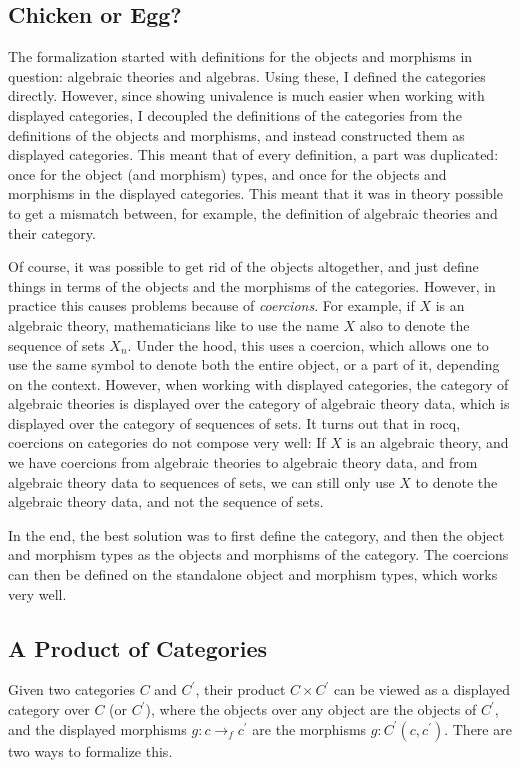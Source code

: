 \subsection{Chicken or Egg?}
The formalization started with definitions for the objects and morphisms in question: algebraic theories and algebras. Using these, I defined the categories directly. However, since showing univalence is much easier when working with displayed categories, I decoupled the definitions of the categories from the definitions of the objects and morphisms, and instead constructed them as displayed categories. This meant that of every definition, a part was duplicated: once for the object (and morphism) types, and once for the objects and morphisms in the displayed categories. This meant that it was in theory possible to get a mismatch between, for example, the definition of algebraic theories and their category.

Of course, it was possible to get rid of the objects altogether, and just define things in terms of the objects and the morphisms of the categories. However, in practice this causes problems because of \textit{coercions}. For example, if $ X $ is an algebraic theory, mathematicians like to use the name $ X $ also to denote the sequence of sets $ X_n $. Under the hood, this uses a coercion, which allows one to use the same symbol to denote both the entire object, or a part of it, depending on the context. However, when working with displayed categories, the category of algebraic theories is displayed over the category of algebraic theory data, which is displayed over the category of sequences of sets. It turns out that in rocq, coercions on categories do not compose very well: If $ X $ is an algebraic theory, and we have coercions from algebraic theories to algebraic theory data, and from algebraic theory data to sequences of sets, we can still only use $ X $ to denote the algebraic theory data, and not the sequence of sets.

In the end, the best solution was to first define the category, and then the object and morphism types as the objects and morphisms of the category. The coercions can then be defined on the standalone object and morphism types, which works very well.

\subsection{A Product of Categories}\label{subsec:displayed-product}
Given two categories $ C $ and $ C^\prime $, their product $ C \times C^\prime $ can be viewed as a displayed category over $ C $ (or $ C^\prime $), where the objects over any object are the objects of $ C^\prime $, and the displayed morphisms $ g: c \to_f c^\prime $ are the morphisms $ g: C^\prime(c, c^\prime) $. There are two ways to formalize this.


